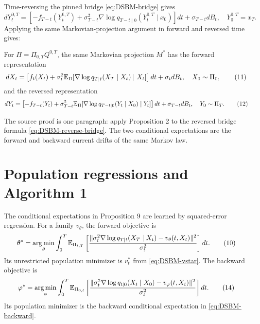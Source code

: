 Time-reversing the pinned bridge \eqref{eq:DSBM-bridge} gives
\begin{equation}
 dY_t^{0,T}
 =\left[-f_{T-t}(Y_t^{0,T})
 +\sigma_{T-t}^2\nabla\log q_{T-t\mid0}(Y_t^{0,T}\mid x_0)\right]dt
 +\sigma_{T-t}dB_t,
 \quad Y_0^{0,T}=x_T.
 \tag{38}\label{eq:DSBM-reverse-bridge}
\end{equation}
Applying the same Markovian-projection argument in forward and reversed time gives:

\begin{proposition}[Proposition 9]
For \(\Pi=\Pi_{0,T}Q^{0,T}\), the same Markovian projection \(M^*\) has the forward representation
\begin{equation}
 dX_t=
 \left[f_t(X_t)+\sigma_t^2
 \mathbb{E}_\Pi[\nabla\log q_{T\mid t}(X_T\mid X_t)\mid X_t]\right]dt
 +\sigma_t dB_t,
 \quad X_0\sim\Pi_0,
 \tag{11}\label{eq:DSBM-forward}
\end{equation}
and the reversed representation
\begin{equation}
 dY_t=
 \left[-f_{T-t}(Y_t)+\sigma_{T-t}^2
 \mathbb{E}_\Pi[\nabla\log q_{T-t\mid0}(Y_t\mid X_0)\mid Y_t]\right]dt
 +\sigma_{T-t}dB_t,
 \quad Y_0\sim\Pi_T.
 \tag{12}\label{eq:DSBM-backward}
\end{equation}
\end{proposition}

The source proof is one paragraph: apply Proposition 2 to the reversed bridge formula \eqref{eq:DSBM-reverse-bridge}.  The two conditional expectations are the forward and backward current drifts of the same Markov law.

\section{Population regressions and Algorithm 1}
The conditional expectations in Proposition 9 are learned by squared-error regression.  For a family \(v_\theta\), the forward objective is
\begin{equation}
 \theta^*=\operatorname*{arg\,min}_\theta
 \int_0^T\mathbb{E}_{\Pi_{t,T}}
 \left[
 \frac{\|\sigma_t^2\nabla\log q_{T\mid t}(X_T\mid X_t)-v_\theta(t,X_t)\|^2}{\sigma_t^2}
 \right]dt.
 \tag{10}\label{eq:DSBM-forward-loss}
\end{equation}
Its unrestricted population minimizer is \(v_t^*\) from \eqref{eq:DSBM-vstar}.  The backward objective is
\begin{equation}
 \varphi^*=\operatorname*{arg\,min}_\varphi
 \int_0^T\mathbb{E}_{\Pi_{0,t}}
 \left[
 \frac{\|\sigma_t^2\nabla\log q_{t\mid0}(X_t\mid X_0)-v_\varphi(t,X_t)\|^2}{\sigma_t^2}
 \right]dt.
 \tag{14}\label{eq:DSBM-backward-loss}
\end{equation}
Its population minimizer is the backward conditional expectation in \eqref{eq:DSBM-backward}.

